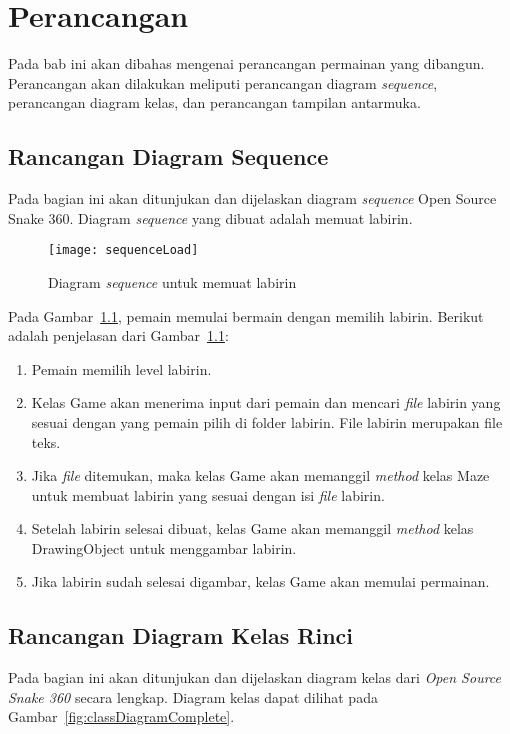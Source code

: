 \chapter{Perancangan}
\label{chap:perancangan}

Pada bab ini akan dibahas mengenai perancangan permainan yang dibangun. Perancangan akan dilakukan meliputi perancangan diagram \textit{sequence}, perancangan diagram kelas, dan perancangan tampilan antarmuka.

\section{Rancangan Diagram Sequence}
Pada bagian ini akan ditunjukan dan dijelaskan diagram \textit{sequence} Open Source Snake 360. Diagram \textit{sequence} yang dibuat adalah memuat labirin. 

\begin{figure}[H]
	\centering  
	\texttt{[image: sequenceLoad]}  
	\caption[Diagram \textit{sequence} untuk memuat labirin]{Diagram \textit{sequence} untuk memuat labirin}
	\label{fig:sequenceLoad} 
\end{figure}

Pada Gambar~\ref{fig:sequenceLoad}, pemain memulai bermain dengan memilih labirin. Berikut adalah penjelasan dari Gambar~\ref{fig:sequenceLoad}:

\begin{enumerate}
	\item Pemain memilih level labirin. 
	\item Kelas Game akan menerima input dari pemain dan mencari \textit{file} labirin yang sesuai dengan yang pemain pilih di folder labirin. File labirin merupakan file teks.
	\item Jika \textit{file} ditemukan, maka kelas Game akan memanggil \textit{method} kelas Maze untuk membuat labirin yang sesuai dengan isi \textit{file} labirin. 
	\item Setelah labirin selesai dibuat, kelas Game akan memanggil \textit{method} kelas DrawingObject untuk menggambar labirin.
	\item Jika labirin sudah selesai digambar, kelas Game akan memulai permainan.
\end{enumerate}

\section{Rancangan Diagram Kelas Rinci}
Pada bagian ini akan ditunjukan dan dijelaskan diagram kelas dari \textit{Open Source Snake 360} secara lengkap. Diagram kelas dapat dilihat pada Gambar~\ref{fig:classDiagramComplete}.

